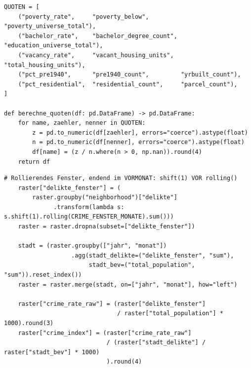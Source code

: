 \begin{lstlisting}[style=pythonstil,
  label={lst:quoten},
  caption={Anteilswerte aus Zählvariablen
           (\texttt{prep/s1\_daten.py}, Z.~559--584, gekürzt)}]
QUOTEN = [
    ("poverty_rate",     "poverty_below",         "poverty_universe_total"),
    ("bachelor_rate",    "bachelor_degree_count", "education_universe_total"),
    ("vacancy_rate",     "vacant_housing_units",  "total_housing_units"),
    ("pct_pre1940",      "pre1940_count",         "yrbuilt_count"),
    ("pct_residential",  "residential_count",     "parcel_count"),
]

def berechne_quoten(df: pd.DataFrame) -> pd.DataFrame:
    for name, zaehler, nenner in QUOTEN:
        z = pd.to_numeric(df[zaehler], errors="coerce").astype(float)
        n = pd.to_numeric(df[nenner], errors="coerce").astype(float)
        df[name] = (z / n.where(n > 0, np.nan)).round(4)
    return df
\end{lstlisting}


\begin{lstlisting}[style=pythonstil,
  label={lst:krimindex},
  caption={Relativer Kriminalitätsindex je Stadtteil und Monat
           (\texttt{prep/s1\_daten.py}, Z.~465--488, gekürzt)}]
    # Rollierendes Fenster, endend im VORMONAT: shift(1) VOR rolling()
    raster["delikte_fenster"] = (
        raster.groupby("neighborhood")["delikte"]
              .transform(lambda s: s.shift(1).rolling(CRIME_FENSTER_MONATE).sum()))
    raster = raster.dropna(subset=["delikte_fenster"])

    stadt = (raster.groupby(["jahr", "monat"])
                   .agg(stadt_delikte=("delikte_fenster", "sum"),
                        stadt_bev=("total_population", "sum")).reset_index())
    raster = raster.merge(stadt, on=["jahr", "monat"], how="left")

    raster["crime_rate_raw"] = (raster["delikte_fenster"]
                                / raster["total_population"] * 1000).round(3)
    raster["crime_index"] = (raster["crime_rate_raw"]
                             / (raster["stadt_delikte"] / raster["stadt_bev"] * 1000)
                             ).round(4)
\end{lstlisting}


